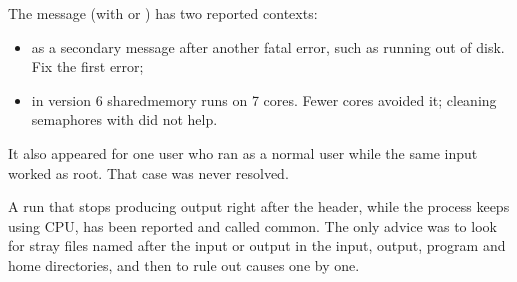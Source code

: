 \documentclass[letterpaper,10pt,english,openany,oneside]{sphinxmanual}
\begin{document}
\sphinxAtStartPar
The message  (with  or ) has two reported contexts:
\begin{itemize}
\item {} 
\sphinxAtStartPar
as a secondary message after another fatal error, such as running out of disk. Fix the first error;



\item {} 
\sphinxAtStartPar
in version 6 shared\sphinxhyphen{}memory runs on 7 cores. Fewer cores avoided it; cleaning semaphores with  did not help.



\end{itemize}

\sphinxAtStartPar
It also appeared for one user who ran as a normal user while the same input worked as root. That case was never
resolved. 

\sphinxAtStartPar
A run that stops producing output right after the header, while the process keeps using CPU, has been reported and
called common. The only advice was to look for stray files named after the input or output in the input, output,
program and home directories, and then to rule out causes one by one. 
\end{document}
